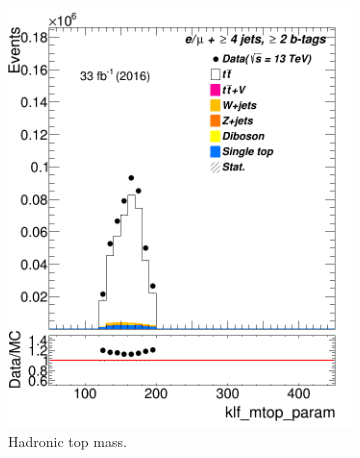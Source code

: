 \begin{figure}
	
	\medskip
	\begin{subfigure}{0.35\textwidth}
		\includegraphics[width=\linewidth]{ControlPlots_emujets_2016_4incl_2incl/klf_mtop_param_emujets_2016.png}
		\caption{Hadronic top mass.} \label{fig:klf16}
	\end{subfigure}
	\hspace*{1.5cm}
	\begin{subfigure}{0.35\textwidth}

\end{subfigure}
\end{figure}
